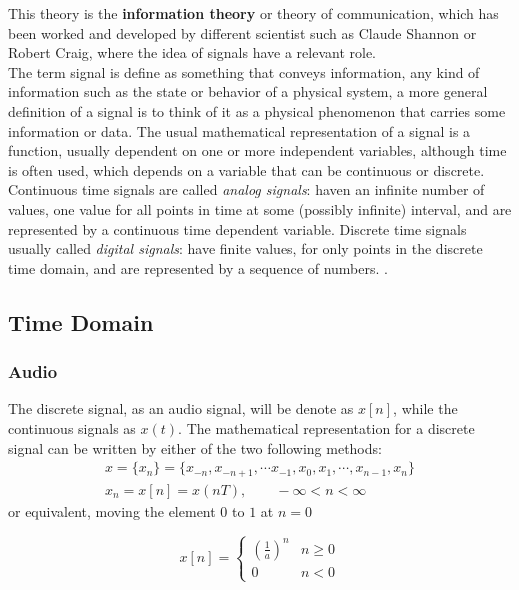 This theory is the \textbf{information theory} or theory of communication, which has been worked and developed by different scientist such as Claude Shannon or Robert Craig, where the idea of signals have a relevant role. \\

The term signal is define as something that conveys information, any kind of information such as the state or behavior of a physical system, a more general definition of a signal is to think of it as a physical phenomenon that carries some information or data. The usual mathematical representation of a signal is a function, usually dependent on one or more independent variables, although time is often used, which depends on a variable that can be continuous or discrete. Continuous time signals are called \textit{analog signals}: haven an infinite number of values, one value for all points in time at some (possibly infinite) interval, and are represented by a continuous time dependent variable. Discrete time signals usually called \textit{digital signals}: have finite values, for only points in the discrete time domain, and are represented by a sequence of numbers. \cite{book_signal_processing, signal_book_modern}. 

\subsection{Time Domain}

\subsubsection{Audio}

The discrete signal, as an audio signal, will be denote as $x[n]$, while the continuous signals as $x(t)$. The mathematical representation for a discrete signal can be written by either of the two following methods:
\begin{gather}\label{signal_def}
    x = \{x_n \} = \{ x_{-n}, x_{-n+1}, \cdots x_{-1}, x_0, x_1, \cdots , x_{n-1}, x_n \} \nonumber \\
    x_n=x[n] = x(nT), \qquad -\infty < n < \infty 
\end{gather}
or equivalent, moving the element $0$ to $1$ at $n=0$

\begin{equation*}
    x[n]= \begin{cases}\left(\frac{1}{a}\right)^n & n \geq 0 \\ 0 & n<0\end{cases}
\end{equation*}

